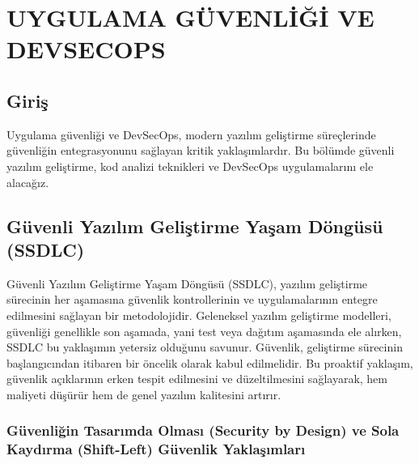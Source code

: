 \chapter{UYGULAMA GÜVENLİĞİ VE DEVSECOPS}

\section*{Giriş}
Uygulama güvenliği ve DevSecOps, modern yazılım geliştirme süreçlerinde güvenliğin entegrasyonunu sağlayan kritik yaklaşımlardır. Bu bölümde güvenli yazılım geliştirme, kod analizi teknikleri ve DevSecOps uygulamalarını ele alacağız.

\section{Güvenli Yazılım Geliştirme Yaşam Döngüsü (SSDLC)}

Güvenli Yazılım Geliştirme Yaşam Döngüsü (SSDLC), yazılım geliştirme sürecinin her aşamasına güvenlik kontrollerinin ve uygulamalarının entegre edilmesini sağlayan bir metodolojidir. Geleneksel yazılım geliştirme modelleri, güvenliği genellikle son aşamada, yani test veya dağıtım aşamasında ele alırken, SSDLC bu yaklaşımın yetersiz olduğunu savunur. Güvenlik, geliştirme sürecinin başlangıcından itibaren bir öncelik olarak kabul edilmelidir. Bu proaktif yaklaşım, güvenlik açıklarının erken tespit edilmesini ve düzeltilmesini sağlayarak, hem maliyeti düşürür hem de genel yazılım kalitesini artırır.

\subsection{Güvenliğin Tasarımda Olması (Security by Design) ve Sola Kaydırma (Shift-Left) Güvenlik Yaklaşımları}

